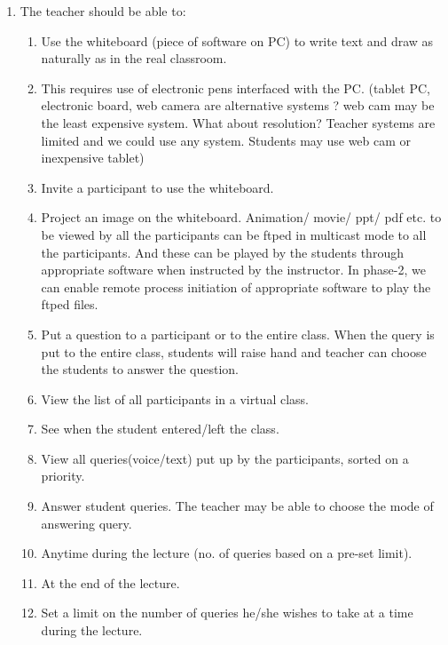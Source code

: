 \documentclass{article}
\begin{document}
\begin{enumerate}
\item[{}{}]
The teacher should be able to: 
\begin{enumerate}

\item Use the whiteboard (piece of software on PC) to write text and draw as naturally as in the real classroom.
\item  This requires use of electronic pens interfaced with the PC. (tablet PC, electronic board, web camera are alternative systems ? web cam may be the least expensive system. What about resolution? Teacher systems are limited and we could use any system. Students may use web cam or inexpensive tablet)
 
\item Invite a participant to use the whiteboard. 
\item Project an image on the whiteboard. Animation/ movie/ ppt/ pdf etc. to be viewed by all the participants can be ftped in multicast mode to all the participants. And these can be played by the students through appropriate software when instructed by the instructor. In phase-2, we can enable remote process initiation of appropriate software to play the ftped files.
 
\item Put a question to a participant or to the entire class. When the query is put to the entire class, students will raise hand and teacher can choose the students to answer the question. 
\item View the list of all participants in a virtual class. 
\item See when the student entered/left the class. 
\item View all queries(voice/text) put up by the participants, sorted on a priority. 
\item Answer student queries. The teacher may be able to choose the mode of answering query. 
\item Anytime during the lecture (no. of queries based on a pre-set limit). 
\item At the end of the lecture. 
\item Set a limit on the number of queries he/she wishes to take at a time during the lecture. 
\end{enumerate}  
\end{enumerate}
\end{document}
